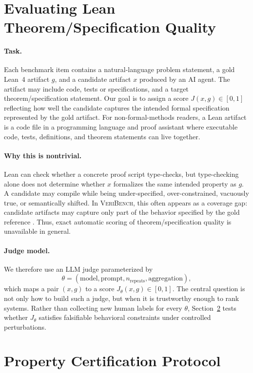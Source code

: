 \documentclass{article}
\begin{document}
\section{Evaluating Lean Theorem/Specification Quality}\label{sec:problem-setup}
\paragraph{Task.}
Each benchmark item contains a natural-language problem statement, a gold Lean~4 artifact
$g$, and a candidate artifact $x$ produced by an AI agent. The artifact may include code,
tests or specifications, and a target theorem/specification statement. Our goal is
to assign a score $J(x,g) \in [0,1]$ reflecting how well the candidate captures the intended formal specification represented
by the gold artifact.
For non-formal-methods readers, a Lean artifact is a code file in a programming language and proof assistant where executable code, tests, definitions, and theorem statements can live together.

\paragraph{Why this is nontrivial.}
Lean can check whether a concrete proof script type-checks, but type-checking alone does
not determine whether $x$ formalizes the same intended property as $g$. A candidate may
compile while being under-specified, over-constrained, vacuously true, or semantically
shifted. In \textsc{VeriBench}, this often appears as a coverage gap: candidate artifacts
may capture only part of the behavior specified by the gold reference
\citep{anonymous2026veribench}. Thus, exact automatic scoring of theorem/specification quality is unavailable in
general.

\paragraph{Judge model.}
We therefore use an LLM judge parameterized by
\[
  \theta = (\text{model}, \text{prompt}, n_{\mathrm{repeats}}, \text{aggregation}),
\]
which maps a pair $(x,g)$ to a score $J_\theta(x,g)\in[0,1]$. The central question is not
only how to build such a judge, but when it is trustworthy enough to rank systems. Rather
than collecting new human labels for every $\theta$, Section~\ref{sec:property-protocol} tests whether $J_\theta$
satisfies falsifiable behavioral constraints under controlled perturbations.

\section{Property Certification Protocol}\label{sec:property-protocol}
\end{document}
